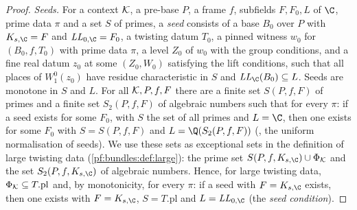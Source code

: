 \begin{proof}
\emph{Seeds.} For a context $\mathcal K$, a pre-base $P$, a frame $f$, subfields $F,F_0,L$ of $\C$, prime data $\pi$ and a set $S$ of primes, a
\emph{seed} consists of a base $B_0$ over $P$ with $K_{s,\C}=F$ and $\mathit{LL}_{0,\C}=F_0$, a twisting datum $T_0$, a pinned witness $w_0$
for $(B_0,f,T_0)$ with prime data $\pi$, a level $Z_0$ of $w_0$ with the group conditions, and a fine real datum $z_0$ at some $(Z_0,W_0)$
satisfying the lift conditions, such that all places of $W_1^0(z_0)$ have residue characteristic in $S$ and $\mathit{LL}_\C(B_0)\subseteq L$.
Seeds are monotone in $S$ and $L$. For all $\mathcal K,P,f,F$ there are a finite set $S(P,f,F)$ of primes and a finite set $S_2(P,f,F)$ of
algebraic numbers such that for every $\pi$: if a seed exists for some $F_0$, with $S$ the set of all primes and $L=\C$, then one exists for
some $F_0$ with $S=S(P,f,F)$ and $L=\Q(S_2(P,f,F))$ (, the uniform
normalisation of seeds). We use these sets as exceptional sets in the definition of large twisting data (\cref{pf:bundles:def:large}): the
prime set $S(P,f,K_{s,\C})\cup\Phi_\bundK$ and the set $S_2(P,f,K_{s,\C})$ of algebraic numbers. Hence, for large twisting data,
$\Phi_\mathcal K\subseteq T.\mathrm{pl}$ and, by monotonicity, for every $\pi$: if a seed with $F=K_{s,\C}$ exists, then one exists with
$F=K_{s,\C}$, $S=T.\mathrm{pl}$ and $L=\mathit{LL}_{0,\C}$ (the \emph{seed condition}).


\end{proof}
